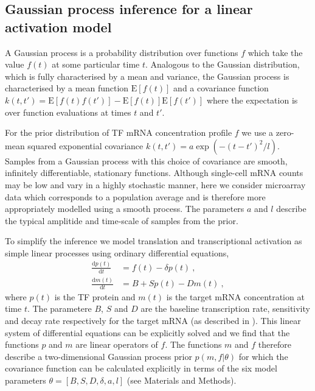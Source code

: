 \documentclass{pnastwo}
\begin{document}
\begin{article}
\section{Gaussian process inference for a linear activation model}

A Gaussian process is a probability distribution over
functions $f$ which take the value $f(t)$ at some particular time
$t$. Analogous to the Gaussian distribution, which is fully characterised by a mean and variance, the Gaussian process is
characterised by a mean function $\mathrm{E}[f(t)]$ and a covariance
function $k(t,t')=\mathrm{E}[f(t)f(t')]-\mathrm{E}[f(t)]\mathrm{E}[f(t')]$
where the expectation is over function evaluations at times $t$ and
$t'$. 

For the prior distribution of TF mRNA concentration profile $f$ we use a zero-mean squared exponential covariance
$k(t,t')=a\exp(-(t-t')^2/l)$. Samples from a Gaussian process with this choice
of covariance are smooth, infinitely differentiable, stationary functions. Although single-cell mRNA counts may be low
and vary in a highly stochastic manner, here we consider microarray data which
corresponds to a population average and is therefore more
appropriately modelled using a smooth process. The parameters $a$ and
$l$ describe the typical amplitide and time-scale of samples from
the prior. 

To simplify the inference we model translation and transcriptional
activation as simple linear processes using ordinary differential
equations,
\begin{align}
  \frac{\mathrm{d}p(t)}{\mathrm{d}t} & = f(t) - \delta
  p(t) \ , \label{eq:translation_ode} \\
  \frac{\mathrm{d}m(t)}{\mathrm{d}t} & = B+Sp(t)-Dm(t) \ , \label{eq:transcription_ode}
\end{align}
where $p(t)$ is the TF protein and $m(t)$ is the target mRNA
concentration at time $t$. The parametere $B$, $S$ and $D$ are the
baseline transcription rate, sensitivity and decay rate respectively
for the target mRNA (as described in \cite{Barenco2006a}). This linear system of differential equations can be
explicitly solved and we find that the functions $p$ and $m$ are
linear operators of $f$. The functions $m$ and $f$ therefore
describe a two-dimensional Gaussian process prior $p(m,f|\theta)$
for which the covariance function can be calculated explicitly in terms of the
six model parameters $\theta=[B,S,D,\delta,a,l]$ (see
Materials and Methods). 


\end{article}
\end{document}
